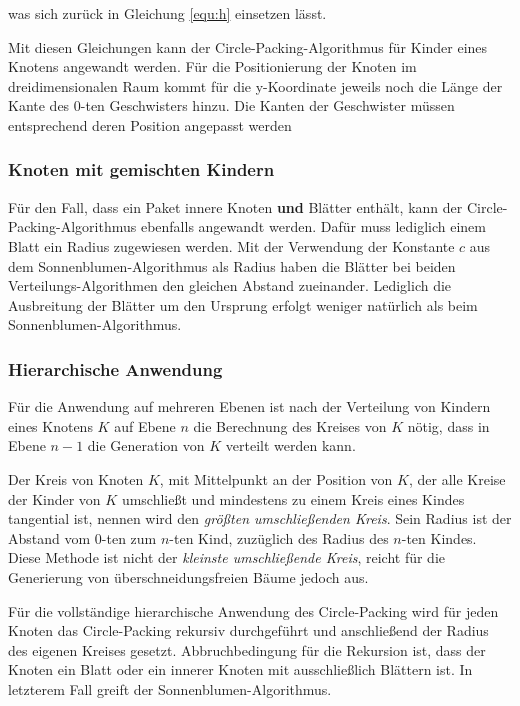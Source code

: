 \noindent was sich zurück in Gleichung \ref{equ:h} einsetzen lässt.

Mit diesen Gleichungen kann der Circle-Packing-Algorithmus für Kinder eines Knotens angewandt werden. Für die Positionierung der Knoten im dreidimensionalen Raum kommt für die y-Koordinate jeweils noch die Länge der Kante des $0$-ten Geschwisters hinzu. Die Kanten der Geschwister müssen entsprechend deren Position angepasst werden

\subsubsection*{Knoten mit gemischten Kindern}

Für den Fall, dass ein Paket innere Knoten \textbf{und} Blätter enthält, kann der Circle-Packing-Algorithmus ebenfalls angewandt werden. Dafür muss lediglich einem Blatt ein Radius zugewiesen werden. Mit der Verwendung der Konstante $c$ aus dem Sonnenblumen-Algorithmus als Radius haben die Blätter bei beiden Verteilungs-Algorithmen den gleichen Abstand zueinander. Lediglich die Ausbreitung der Blätter um den Ursprung erfolgt weniger natürlich als beim Sonnenblumen-Algorithmus.

\subsubsection*{Hierarchische Anwendung}

Für die Anwendung auf mehreren Ebenen ist nach der Verteilung von Kindern eines Knotens $K$ auf Ebene $n$ die Berechnung des Kreises von $K$ nötig, dass in Ebene $n - 1$ die Generation von $K$ verteilt werden kann.

Der Kreis von Knoten $K$, mit Mittelpunkt an der Position von $K$, der alle Kreise der Kinder von $K$ umschließt und mindestens zu einem Kreis eines Kindes tangential ist, nennen wird den \textit{größten umschließenden Kreis}. Sein Radius ist der Abstand vom $0$-ten zum $n$-ten Kind, zuzüglich des Radius des $n$-ten Kindes. Diese Methode ist nicht der \textit{kleinste umschließende Kreis}, reicht für die Generierung von überschneidungsfreien Bäume jedoch aus.

Für die vollständige hierarchische Anwendung des Circle-Packing wird für jeden Knoten das Circle-Packing rekursiv durchgeführt und anschließend der Radius des eigenen Kreises gesetzt. Abbruchbedingung für die Rekursion ist, dass der Knoten ein Blatt oder ein innerer Knoten mit ausschließlich Blättern ist. In letzterem Fall greift der Sonnenblumen-Algorithmus.

